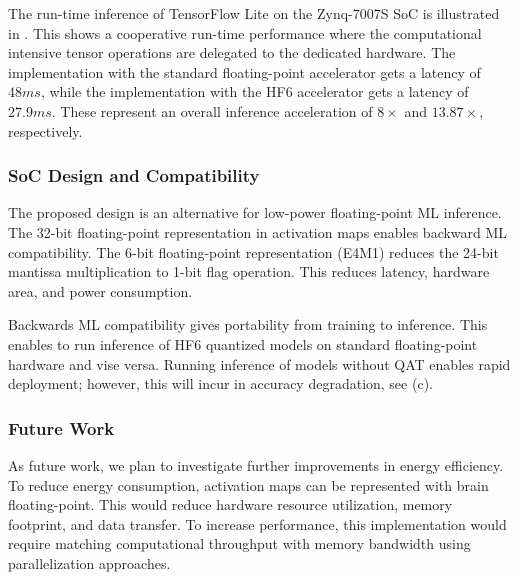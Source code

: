 The run-time inference of TensorFlow Lite on the Zynq-7007S SoC is illustrated in . This shows a cooperative run-time performance where the computational intensive tensor operations are delegated to the dedicated hardware. The implementation with the standard floating-point accelerator gets a latency of $48 ms$, while the implementation with the HF6 accelerator gets a latency of $27.9 ms$. These represent an overall inference acceleration of $8\times$ and $13.87\times$, respectively.

\subsubsection{SoC Design and Compatibility}
The proposed design is an alternative for low-power floating-point ML inference. The 32-bit floating-point representation in activation maps enables backward ML compatibility. The 6-bit floating-point representation (E4M1) reduces the 24-bit mantissa multiplication to 1-bit flag operation. This reduces latency, hardware area, and power consumption.

Backwards ML compatibility gives portability from training to inference. This enables to run inference of HF6 quantized models on standard floating-point hardware and vise versa. Running inference of models without QAT enables rapid deployment; however, this will incur in accuracy degradation, see (c).

\subsubsection{Future Work}
As future work, we plan to investigate further improvements in energy efficiency. To reduce energy consumption, activation maps can be represented with brain floating-point. This would reduce hardware resource utilization, memory footprint, and data transfer. To increase performance, this implementation would require matching computational throughput with memory bandwidth using parallelization approaches.